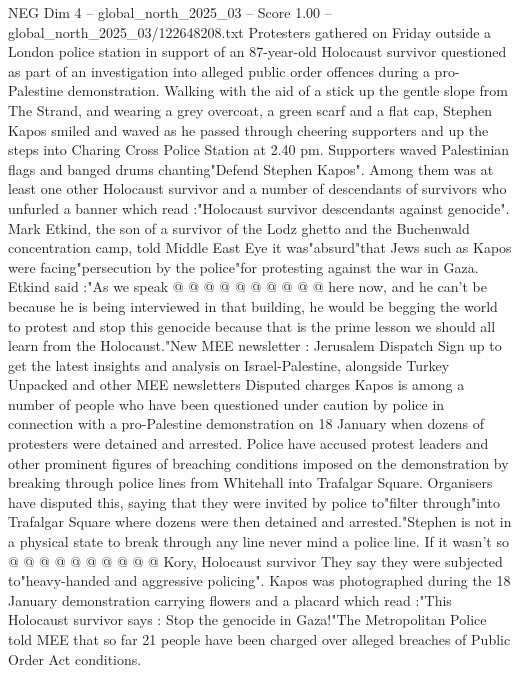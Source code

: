 \begin{textsample}{NEG Dim 4 – global\_north\_2025\_03 – Score 1.00 – global\_north\_2025\_03/122648208.txt}  \label{ex:f4_neg_393}
Protesters gathered on Friday outside a London police station in support of an 87-year-old Holocaust survivor questioned as part of an investigation into alleged public order offences during a pro-Palestine demonstration.
Walking with the aid of a stick up the gentle slope from The Strand, and wearing a grey overcoat, a green scarf and a flat cap, Stephen Kapos smiled and waved as he passed through cheering supporters and up the steps into Charing Cross Police Station at 2.40 pm.
Supporters waved Palestinian flags and banged drums chanting"Defend Stephen Kapos".
Among them was at least one other Holocaust survivor and a number of descendants of survivors who unfurled a banner which read :"Holocaust survivor descendants against genocide".
Mark Etkind, the son of a survivor of the Lodz ghetto and the Buchenwald concentration camp, told Middle East Eye it was"absurd"that Jews such as Kapos were facing"persecution by the police"for protesting against the war in Gaza.
Etkind said :"As we speak @ @ @ @ @ @ @ @ @ @ here now, and he can't be because he is being interviewed in that building, he would be begging the world to protest and stop this genocide because that is the prime lesson we should all learn from the Holocaust."New MEE newsletter : Jerusalem Dispatch Sign up to get the latest insights and analysis on Israel-Palestine, alongside Turkey Unpacked and other MEE newsletters Disputed charges Kapos is among a number of people who have been questioned under caution by police in connection with a pro-Palestine demonstration on 18 January when dozens of protesters were detained and arrested.
Police have accused protest leaders and other prominent figures of breaching conditions imposed on the demonstration by breaking through police lines from Whitehall into Trafalgar Square.
Organisers have disputed this, saying that they were invited by police to"filter through"into Trafalgar Square where dozens were then detained and arrested."Stephen is not in a physical state to break through any line never mind a police line.
If it wasn't so @ @ @ @ @ @ @ @ @ @ Kory, Holocaust survivor They say they were subjected to"heavy-handed and aggressive policing".
Kapos was photographed during the 18 January demonstration carrying flowers and a placard which read :"This Holocaust survivor says : Stop the genocide in Gaza!"The Metropolitan Police told MEE that so far 21 people have been charged over alleged breaches of Public Order Act conditions.

\end{textsample}
